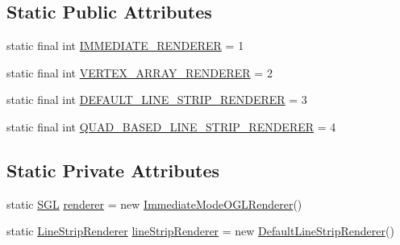 \subsection*{Static Public Attributes}
\begin{DoxyCompactItemize}
\item 
static final int \mbox{\hyperlink{classorg_1_1newdawn_1_1slick_1_1opengl_1_1renderer_1_1_renderer_a882d9f188c116a6e5258b3e47c47f084}{I\+M\+M\+E\+D\+I\+A\+T\+E\+\_\+\+R\+E\+N\+D\+E\+R\+ER}} = 1
\item 
static final int \mbox{\hyperlink{classorg_1_1newdawn_1_1slick_1_1opengl_1_1renderer_1_1_renderer_a36ea0003dbe799332e5b022ca0290c6c}{V\+E\+R\+T\+E\+X\+\_\+\+A\+R\+R\+A\+Y\+\_\+\+R\+E\+N\+D\+E\+R\+ER}} = 2
\item 
static final int \mbox{\hyperlink{classorg_1_1newdawn_1_1slick_1_1opengl_1_1renderer_1_1_renderer_aaf62f21044202dd497512946fe32de8e}{D\+E\+F\+A\+U\+L\+T\+\_\+\+L\+I\+N\+E\+\_\+\+S\+T\+R\+I\+P\+\_\+\+R\+E\+N\+D\+E\+R\+ER}} = 3
\item 
static final int \mbox{\hyperlink{classorg_1_1newdawn_1_1slick_1_1opengl_1_1renderer_1_1_renderer_a683e73dc21ff6bc56e533a1e10a01f8f}{Q\+U\+A\+D\+\_\+\+B\+A\+S\+E\+D\+\_\+\+L\+I\+N\+E\+\_\+\+S\+T\+R\+I\+P\+\_\+\+R\+E\+N\+D\+E\+R\+ER}} = 4
\end{DoxyCompactItemize}
\subsection*{Static Private Attributes}
\begin{DoxyCompactItemize}
\item 
static \mbox{\hyperlink{interfaceorg_1_1newdawn_1_1slick_1_1opengl_1_1renderer_1_1_s_g_l}{S\+GL}} \mbox{\hyperlink{classorg_1_1newdawn_1_1slick_1_1opengl_1_1renderer_1_1_renderer_abe140c4ec95e1ff80b86eb12a3508713}{renderer}} = new \mbox{\hyperlink{classorg_1_1newdawn_1_1slick_1_1opengl_1_1renderer_1_1_immediate_mode_o_g_l_renderer}{Immediate\+Mode\+O\+G\+L\+Renderer}}()
\item 
static \mbox{\hyperlink{interfaceorg_1_1newdawn_1_1slick_1_1opengl_1_1renderer_1_1_line_strip_renderer}{Line\+Strip\+Renderer}} \mbox{\hyperlink{classorg_1_1newdawn_1_1slick_1_1opengl_1_1renderer_1_1_renderer_ad67da40e0608a905d1d28ae6f029e293}{line\+Strip\+Renderer}} = new \mbox{\hyperlink{classorg_1_1newdawn_1_1slick_1_1opengl_1_1renderer_1_1_default_line_strip_renderer}{Default\+Line\+Strip\+Renderer}}()
\end{DoxyCompactItemize}


